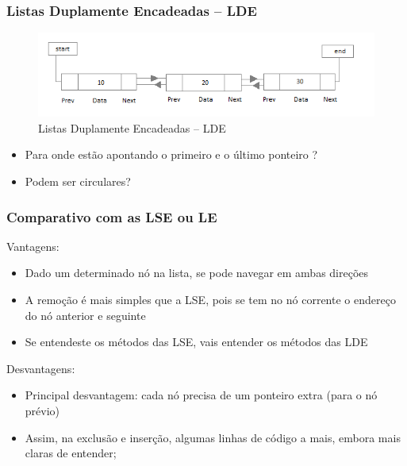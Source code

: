 
\begin{frame}%

\frametitle{Listas Duplamente Encadeadas -- LDE}

\begin{figure}[!hb]
	\centering
\includegraphics[height=0.450\paperheight, width=0.8\paperwidth]{figs/fig_listas/lista_DE_01.png}						
			\caption{Listas Duplamente Encadeadas -- LDE}	
		\end{figure} 

\begin{itemize}
  \item Para onde estão apontando  o primeiro e o último  ponteiro ?
  \item Podem ser circulares?
\end{itemize}
\end{frame} 

\begin{frame}
\frametitle{Comparativo com as LSE ou LE}

\begin{block}{Vantagens:}
\begin{itemize}
  \item Dado um determinado nó na lista, se pode navegar em ambas direções
  \item A remoção é mais simples que a LSE, pois se tem no nó corrente
  o endereço do nó anterior e seguinte
  \item Se entendeste os métodos das LSE, vais entender os métodos das LDE
\end{itemize}
\end{block}

\begin{block}{Desvantagens:}
\begin{itemize}
  \item Principal desvantagem: cada nó precisa de um ponteiro extra (para o nó prévio)
  \item Assim, na exclusão e inserção, algumas linhas de código a mais,
  embora mais claras de entender;

\end{itemize}
\end{block}
\end{frame} 

